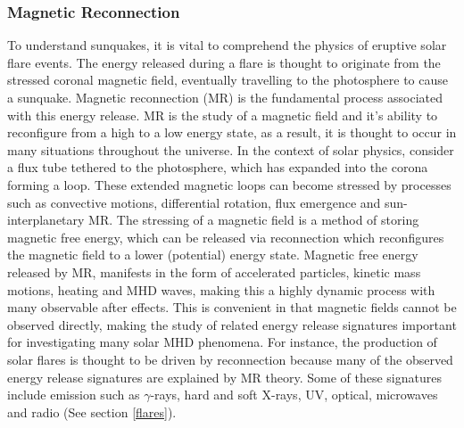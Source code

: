 \subsubsection{Magnetic Reconnection}\label{MR}
To understand sunquakes, it is vital to comprehend the physics of eruptive solar flare events. The energy released during a flare is thought to originate from the stressed coronal magnetic field, eventually travelling to the photosphere to cause a sunquake. Magnetic reconnection (MR) is the fundamental process associated with this energy release. MR is the study of a magnetic field and it's ability to reconfigure from a high to a low energy state, as a result, it is thought to occur in many situations throughout the universe. In the context of solar physics, consider a flux tube tethered to the photosphere, which has expanded into the corona forming a loop. These extended magnetic loops can become stressed by processes such as convective motions, differential rotation, flux emergence and sun-interplanetary MR. The stressing of a magnetic field is a method of storing magnetic free energy, which can be released via reconnection which reconfigures the magnetic field to a lower (potential) energy state. Magnetic free energy released by MR, manifests in the form of accelerated particles, kinetic mass motions, heating and MHD waves, making this a highly dynamic process with many observable after effects. This is convenient in that magnetic fields cannot be observed directly, making the study of related energy release signatures important for investigating many solar MHD phenomena. For instance, the production of solar flares is thought to be driven by reconnection because many of the observed energy release signatures are explained by MR theory. Some of these signatures include emission such as $\gamma$-rays, hard and soft X-rays, UV, optical, microwaves and radio (See section \ref{flares}).

